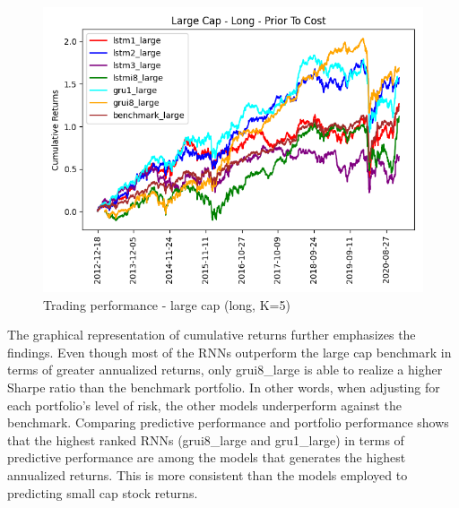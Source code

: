 \begin{figure}[H]
\centering
\includegraphics [scale=0.60,angle=360]{figures/cumulative_large_cap_return_no_cost.png}
\caption{Trading performance - large cap (long, K=5)}
\label{fig:largetrading}
\end{figure}
\indent\newline 
The graphical representation of cumulative returns further emphasizes the findings. Even though most of the RNNs outperform the large cap benchmark in terms of greater annualized returns, only grui8\_large is able to realize a higher Sharpe ratio than the benchmark portfolio. In other words, when adjusting for each portfolio's level of risk, the other models underperform against the benchmark. Comparing predictive performance and portfolio performance shows that the highest ranked RNNs (grui8\_large and gru1\_large) in terms of predictive performance are among the models that generates the highest annualized returns. This is more consistent than the models employed to predicting small cap stock returns.     

